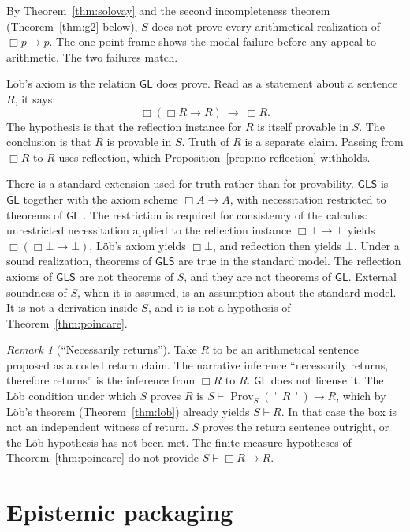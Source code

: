 \documentclass[11pt]{article}
\newcommand{\gn}[1]{\ulcorner #1 \urcorner}
\DeclareMathOperator{\Prov}{Prov}
\newcommand{\GL}{\mathsf{GL}}
\newcommand{\GLS}{\mathsf{GLS}}
\theoremstyle{definition}
\theoremstyle{remark}
\newtheorem{remark}[theorem]{Remark}
\begin{document}
By Theorem~\ref{thm:solovay} and the second incompleteness theorem (Theorem~\ref{thm:g2} below), \(S\) does not prove every arithmetical realization of \(\Box p\to p\).
The one-point frame shows the modal failure before any appeal to arithmetic.
The two failures match.

L\"ob's axiom is the relation \(\GL\) does prove.
Read as a statement about a sentence \(R\), it says:
\begin{equation}
\label{eq:lob-reading}
\Box(\Box R\to R)\ \to\ \Box R.
\end{equation}
The hypothesis is that the reflection instance for \(R\) is itself provable in \(S\).
The conclusion is that \(R\) is provable in \(S\).
Truth of \(R\) is a separate claim.
Passing from \(\Box R\) to \(R\) uses reflection, which Proposition~\ref{prop:no-reflection} withholds.

There is a standard extension used for truth rather than for provability.
\(\GLS\) is \(\GL\) together with the axiom scheme \(\Box A\to A\), with necessitation restricted to theorems of \(\GL\) \citep{boolos1993}.
The restriction is required for consistency of the calculus: unrestricted necessitation applied to the reflection instance \(\Box\bot\to\bot\) yields \(\Box(\Box\bot\to\bot)\), L\"ob's axiom yields \(\Box\bot\), and reflection then yields \(\bot\).
Under a sound realization, theorems of \(\GLS\) are true in the standard model.
The reflection axioms of \(\GLS\) are not theorems of \(S\), and they are not theorems of \(\GL\).
External soundness of \(S\), when it is assumed, is an assumption about the standard model.
It is not a derivation inside \(S\), and it is not a hypothesis of Theorem~\ref{thm:poincare}.

\begin{remark}[``Necessarily returns'']
\label{rem:necessarily}
Take \(R\) to be an arithmetical sentence proposed as a coded return claim.
The narrative inference ``necessarily returns, therefore returns'' is the inference from \(\Box R\) to \(R\).
\(\GL\) does not license it.
The L\"ob condition under which \(S\) proves \(R\) is \(S\vdash \Prov_{S}(\gn{R})\to R\), which by L\"ob's theorem (Theorem~\ref{thm:lob}) already yields \(S\vdash R\).
In that case the box is not an independent witness of return.
\(S\) proves the return sentence outright, or the L\"ob hypothesis has not been met.
The finite-measure hypotheses of Theorem~\ref{thm:poincare} do not provide \(S\vdash \Box R\to R\).
\end{remark}

\section{Epistemic packaging}
\label{sec:epistemic}
\end{document}
